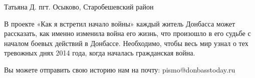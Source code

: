 Татьяна Д. пгт. Осыково, Старобешевский район

В проекте «Как я встретил начало войны» каждый житель Донбасса может
рассказать, как именно изменила война его жизнь, что произошло в его судьбе с
началом боевых действий в Донбассе. Необходимо, чтобы весь мир узнал о тех
тревожных днях 2014 года, когда началась гражданская война.

Вы можете отправить свою историю нам на почту: pismo@donbasstoday.ru

